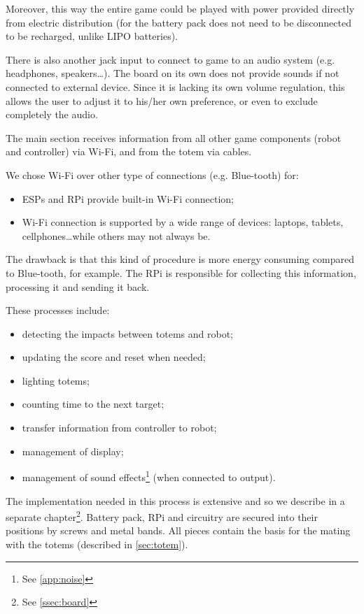 \documentclass[a4paper,twoside]{book}
\begin{document}
Moreover, this way the entire game could be played with power provided directly from electric distribution (for the battery pack does not need to be disconnected to be recharged, unlike LIPO batteries).

There is also another jack input to connect to game to an audio system (e.g. headphones, speakers\ldots). The board on its own does not provide sounds if not connected to external device. Since it is lacking its own volume regulation, this allows the user to adjust it to his/her own preference, or even to exclude completely the audio.

The main section receives information from all other game components (robot and controller) via Wi-Fi, and from the totem via cables.

\beforelist We chose Wi-Fi over other type of connections (e.g. Blue-tooth) for:
\begin{itemize}
\item ESPs and RPi provide built-in Wi-Fi connection;
\item Wi-Fi connection is supported by a wide range of devices: laptops, tablets, cellphones\ldots while others may not always be. 
\end{itemize}
\afterlist*
The drawback is that this kind of procedure is more energy consuming compared to Blue-tooth, for example.
The RPi is responsible for collecting this information, processing it and sending it back.

\beforelist These processes include:
\begin{itemize}
\item detecting the impacts between totems and robot;
\item updating the score and reset when needed;
\item lighting totems;
\item counting time to the next target;
\item transfer information from controller to robot;
\item management of display;
\item management of sound effects\footnote {See \autoref{app:noise}} (when connected to output).
\end{itemize}
\afterlist*
The implementation needed in this process is extensive and so we describe in a separate chapter\footnote{ See \autoref{ssec:board}}.
Battery pack, RPi and circuitry are secured into their positions by screws and metal bands. All pieces contain the basis for the mating with the totems (described in
\autoref{sec:totem}).
\end{document}

